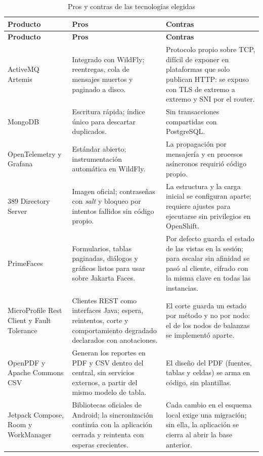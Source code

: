 {\small
\begin{longtable}{|p{3.4cm}|p{6cm}|p{6.2cm}|}
    \caption{Pros y contras de las tecnologías elegidas}\label{tab:pros-contras}\\
    \hline
    \textbf{Producto} & \textbf{Pros} & \textbf{Contras} \\
    \hline
    \endfirsthead
    \hline
    \textbf{Producto} & \textbf{Pros} & \textbf{Contras} \\
    \hline
    \endhead
    ActiveMQ Artemis & Integrado con WildFly; reentregas, cola de mensajes muertos y paginado a disco. & Protocolo propio sobre TCP, difícil de exponer en plataformas que solo publican HTTP: se expuso con TLS de extremo a extremo y SNI por el router. \\
    \hline
    MongoDB & Escritura rápida; índice único para descartar duplicados. & Sin transacciones compartidas con PostgreSQL. \\
    \hline
    OpenTelemetry y Grafana & Estándar abierto; instrumentación automática en WildFly. & La propagación por mensajería y en procesos asíncronos requirió código propio. \\
    \hline
    389 Directory Server & Imagen oficial; contraseñas con \textit{salt} y bloqueo por intentos fallidos sin código propio. & La estructura y la carga inicial se configuran aparte; requiere ajustes para ejecutarse sin privilegios en OpenShift. \\
    \hline
    PrimeFaces & Formularios, tablas paginadas, diálogos y gráficos listos para usar sobre Jakarta Faces. & Por defecto guarda el estado de las vistas en la sesión; para escalar sin afinidad se pasó al cliente, cifrado con la misma clave en todas las instancias. \\
    \hline
    MicroProfile Rest Client y Fault Tolerance & Clientes REST como interfaces Java; espera, reintentos, corte y comportamiento degradado declarados con anotaciones. & El corte guarda un estado por método y no por nodo: el de los nodos de balanzas se implementó aparte. \\
    \hline
    OpenPDF y Apache Commons CSV & Generan los reportes en PDF y CSV dentro del central, sin servicios externos, a partir del mismo modelo de tabla. & El diseño del PDF (fuentes, tablas y celdas) se arma en código, sin plantillas. \\
    \hline
    Jetpack Compose, Room y WorkManager & Bibliotecas oficiales de Android; la sincronización continúa con la aplicación cerrada y reintenta con esperas crecientes. & Cada cambio en el esquema local exige una migración; sin ella, la aplicación se cierra al abrir la base anterior. \\

\end{longtable}}
